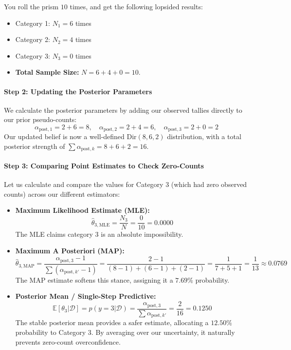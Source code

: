 \documentclass{article}
\begin{document}
You roll the prism $10$ times, and get the following lopsided results:
\begin{itemize}
    \item Category 1: $N_1 = 6$ times
    \item Category 2: $N_2 = 4$ times
    \item Category 3: $N_3 = 0$ times
    \item \textbf{Total Sample Size:} $N = 6 + 4 + 0 = 10$.
\end{itemize}

\paragraph{Step 2: Updating the Posterior Parameters}
We calculate the posterior parameters by adding our observed tallies directly to our prior pseudo-counts:
\begin{equation}
\alpha_{\text{post},1} = 2 + 6 = 8, \quad \alpha_{\text{post},2} = 2 + 4 = 6, \quad \alpha_{\text{post},3} = 2 + 0 = 2
\end{equation}
Our updated belief is now a well-defined $\text{Dir}(8, 6, 2)$ distribution, with a total posterior strength of $\sum \alpha_{\text{post},k} = 8 + 6 + 2 = 16$.

\paragraph{Step 3: Comparing Point Estimates to Check Zero-Counts}
Let us calculate and compare the values for Category 3 (which had zero observed counts) across our different estimators:
\begin{itemize}
    \item \textbf{Maximum Likelihood Estimate (MLE):}
    \begin{equation}
    \hat{\theta}_{3,\text{MLE}} = \frac{N_3}{N} = \frac{0}{10} = 0.0000
    \end{equation}
    The MLE claims category 3 is an absolute impossibility.
    
    \item \textbf{Maximum A Posteriori (MAP):}
    \begin{equation}
    \hat{\theta}_{3,\text{MAP}} = \frac{\alpha_{\text{post},3} - 1}{\sum (\alpha_{\text{post},k'} - 1)} = \frac{2 - 1}{(8-1) + (6-1) + (2-1)} = \frac{1}{7 + 5 + 1} = \frac{1}{13} \approx 0.0769
    \end{equation}
    The MAP estimate softens this stance, assigning it a $7.69\%$ probability.
    
    \item \textbf{Posterior Mean / Single-Step Predictive:}
    \begin{equation}
    \mathbb{E}[\theta_3|\mathcal{D}] = p(y=3|\mathcal{D}) = \frac{\alpha_{\text{post},3}}{\sum \alpha_{\text{post},k'}} = \frac{2}{16} = 0.1250
    \end{equation}
    The stable posterior mean provides a safer estimate, allocating a $12.50\%$ probability to Category 3. By averaging over our uncertainty, it naturally prevents zero-count overconfidence.
\end{itemize}
\end{document}
